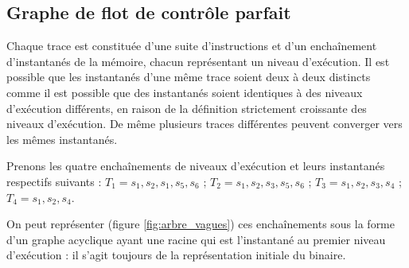 \FloatBarrier
\subsection{Graphe de flot de contrôle parfait\label{sec:gfc_parfait}}

Chaque trace est constituée d'une suite d'instructions et d'un enchaînement d'instantanés de la mémoire, chacun représentant un niveau d'exécution.
Il est possible que les instantanés d'une même trace soient deux à deux distincts comme il est possible que des instantanés soient identiques à des niveaux d'exécution différents, en raison de la définition strictement croissante des niveaux d'exécution.
De même plusieurs traces différentes peuvent converger vers les mêmes instantanés.

Prenons les quatre enchaînements de niveaux d'exécution et leurs instantanés respectifs suivants :
$T_1 = s_1, s_2, s_1, s_5, s_6$ ; 
$T_2 = s_1, s_2, s_3, s_5, s_6$ ; 
$T_3 = s_1, s_2, s_3, s_4$ ; 
$T_4 = s_1, s_2, s_4$.

On peut représenter (figure \ref{fig:arbre_vagues}) ces enchaînements sous la forme d'un graphe acyclique ayant une racine qui est l'instantané au premier niveau d'exécution : il s'agit toujours de la représentation initiale du binaire.

